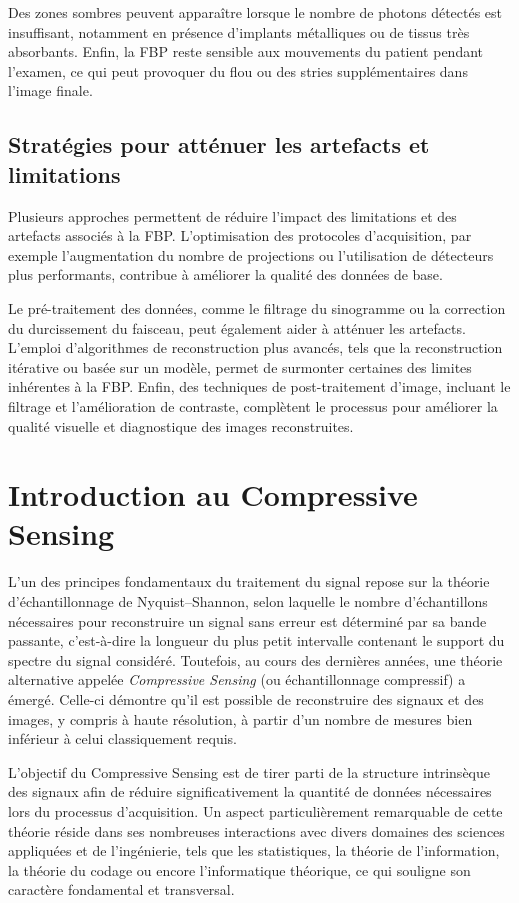 Des zones sombres peuvent apparaître lorsque le nombre de photons détectés est insuffisant, notamment en présence d'implants métalliques ou de tissus très absorbants. Enfin, la FBP reste sensible aux mouvements du patient pendant l'examen, ce qui peut provoquer du flou ou des stries supplémentaires dans l'image finale.

\subsection{Stratégies pour atténuer les artefacts et limitations}

Plusieurs approches permettent de réduire l'impact des limitations et des artefacts associés à la FBP. L'optimisation des protocoles d'acquisition, par exemple l'augmentation du nombre de projections ou l'utilisation de détecteurs plus performants, contribue à améliorer la qualité des données de base.  

Le pré-traitement des données, comme le filtrage du sinogramme ou la correction du durcissement du faisceau, peut également aider à atténuer les artefacts. L'emploi d'algorithmes de reconstruction plus avancés, tels que la reconstruction itérative ou basée sur un modèle, permet de surmonter certaines des limites inhérentes à la FBP. Enfin, des techniques de post-traitement d'image, incluant le filtrage et l'amélioration de contraste, complètent le processus pour améliorer la qualité visuelle et diagnostique des images reconstruites.

\section{Introduction au Compressive Sensing}

L'un des principes fondamentaux du traitement du signal repose sur la théorie
d'échantillonnage de Nyquist--Shannon, selon laquelle le nombre d'échantillons
nécessaires pour reconstruire un signal sans erreur est déterminé par sa bande
passante, c'est-à-dire la longueur du plus petit intervalle contenant le support du
spectre du signal considéré. Toutefois, au cours des dernières années, une théorie
alternative appelée \emph{Compressive Sensing} (ou échantillonnage compressif) a
émergé. Celle-ci démontre qu'il est possible de reconstruire des signaux et des images,
y compris à haute résolution, à partir d'un nombre de mesures bien inférieur à celui
classiquement requis.

L'objectif du Compressive Sensing est de tirer parti de la structure intrinsèque des
signaux afin de réduire significativement la quantité de données nécessaires lors du
processus d'acquisition. Un aspect particulièrement remarquable de cette théorie
réside dans ses nombreuses interactions avec divers domaines des sciences appliquées
et de l'ingénierie, tels que les statistiques, la théorie de l'information, la théorie du
codage ou encore l'informatique théorique, ce qui souligne son caractère fondamental
et transversal.

